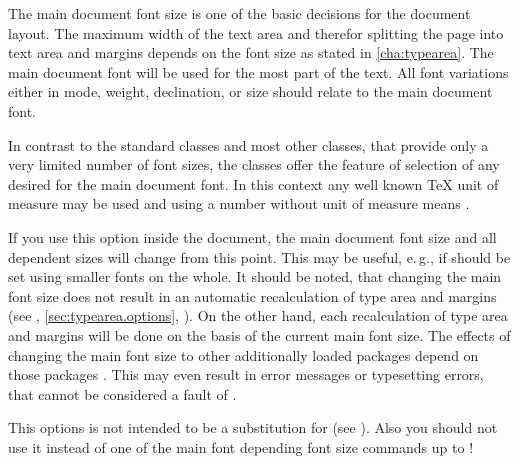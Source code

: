 The main document font size is one of the basic decisions for the document
layout. The maximum width of the text area and therefor splitting the page
into text area and margins depends on the font size as stated in
\autoref{cha:typearea}. The main document font will be used for the most part
of the text. All font variations either in mode, weight, declination, or size
should relate to the main document font.


\begin{Declaration}
\end{Declaration}
%
In contrast to the standard classes and most other classes, that provide only
a very limited number of font sizes, the \KOMAScript{} classes offer the
feature of selection of any desired  for the main document
font. In this context any well known \TeX{} unit of measure may be used and
using a number without unit of measure means .

If you use this option inside the document, the main document font size and
all dependent sizes will change from this point. This may be useful, e.\,g., if
%
%
%
should be set using smaller fonts on the whole. It should be noted, that
changing the main font size does not result in an automatic recalculation of
type area and margins (see ,
\autoref{sec:typearea.options},
). On the other hand, each
recalculation of type area and margins will be done on the basis of the
current main font size. The effects of changing the main font size to other
additionally loaded packages %
%
depend on those packages%
%
. This may even result in error messages or typesetting errors, that cannot
be considered a fault of \KOMAScript.

This options is not intended to be a substitution for
 (see \cite{latex:fntguide}). Also you should not use it
instead of one of the main font depending font size commands  up
to !%

\fi  %


